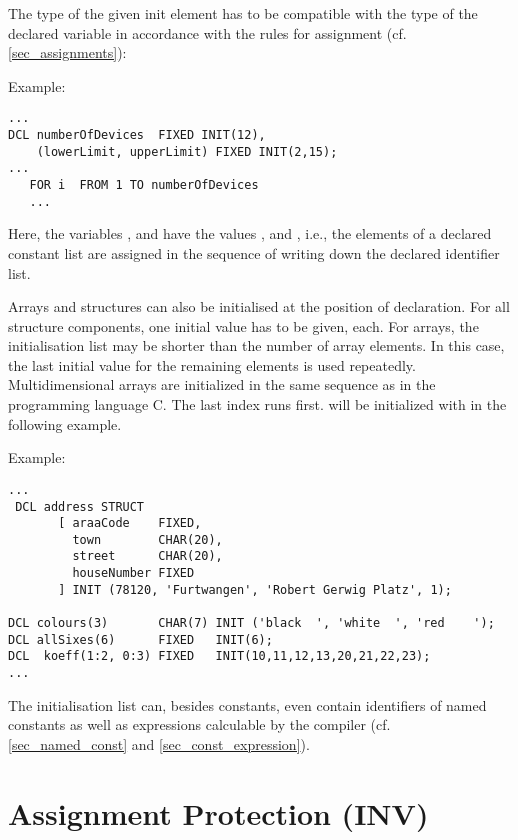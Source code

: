 The type of the given init element has to be compatible with the type of
the declared variable in accordance with the rules for assignment (cf.
\ref{sec_assignments}):

Example:

\begin{lstlisting}
...
DCL numberOfDevices  FIXED INIT(12),
    (lowerLimit, upperLimit) FIXED INIT(2,15);
...
   FOR i  FROM 1 TO numberOfDevices
   ...
\end{lstlisting}

Here, the variables ,  
and 
 have the values ,  and ,
 i.e., the elements of a declared constant list are assigned in
the sequence of writing down the declared identifier list.

Arrays and structures can also be initialised at the position of
declaration. For all structure components, one initial value has to be
given, each. For arrays, the initialisation list may be shorter than the
number of array elements. In this case, the last initial value for the
remaining elements is used repeatedly.
Multidimensional arrays are initialized in the same sequence as in the 
programming language C. The last index runs first.
 will be initialized with  in the following example.

Example:

\begin{lstlisting}
...
 DCL address STRUCT 
       [ araaCode    FIXED,
         town        CHAR(20),
         street      CHAR(20),
         houseNumber FIXED
       ] INIT (78120, 'Furtwangen', 'Robert Gerwig Platz', 1);

DCL colours(3)       CHAR(7) INIT ('black  ', 'white  ', 'red    ');
DCL allSixes(6)      FIXED   INIT(6);
DCL  koeff(1:2, 0:3) FIXED   INIT(10,11,12,13,20,21,22,23);
... 
\end{lstlisting}

The initialisation list can, besides constants, even contain identifiers
of named constants as well as expressions calculable by the compiler
(cf. \ref{sec_named_const} and \ref{sec_const_expression}).

\section{Assignment Protection (INV)}    %
\label{sec_inv}

